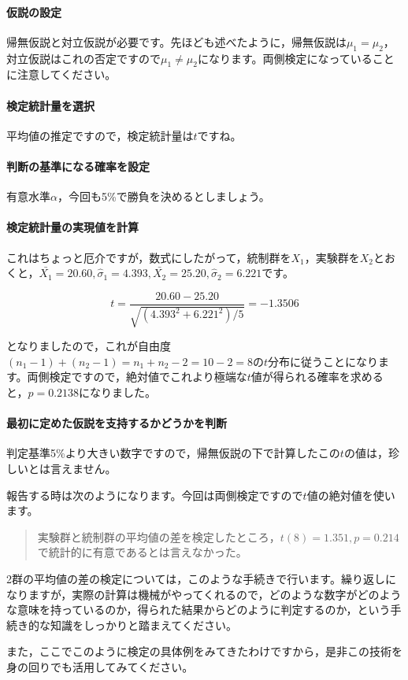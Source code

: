 \documentclass{ltjsbook}
\begin{document}
\paragraph{仮説の設定}帰無仮説と対立仮説が必要です。先ほども述べたように，帰無仮説は$\mu_1=\mu_2$，対立仮説はこれの否定ですので$\mu_1 \neq \mu_2$になります。両側検定になっていることに注意してください。
\paragraph{検定統計量を選択}平均値の推定ですので，検定統計量は$t$ですね。
\paragraph{判断の基準になる確率を設定}有意水準$\alpha$，今回も5\%で勝負を決めるとしましょう。
\paragraph{検定統計量の実現値を計算}これはちょっと厄介ですが，数式にしたがって，統制群を$X_1$，実験群を$X_2$とおくと，$\bar{X_1}=20.60,\hat{\sigma}_1=4.393,\bar{X_2}=25.20,\hat{\sigma}_2=6.221$です。

\[ t = \frac{20.60-25.20}{\sqrt{(4.393^2+6.221^2)/5}} = -1.3506\]

となりましたので，これが自由度$(n_1-1)+(n_2-1)=n_1+n_2-2=10-2=8$の$t$分布に従うことになります。両側検定ですので，絶対値でこれより極端な$t$値が得られる確率を求めると，$p=0.2138$になりました。

\paragraph{最初に定めた仮説を支持するかどうかを判断}
判定基準5\%より大きい数字ですので，帰無仮説の下で計算したこの$t$の値は，珍しいとは言えません。

報告する時は次のようになります。今回は両側検定ですので$t$値の絶対値を使います。
\begin{quote}
	実験群と統制群の平均値の差を検定したところ，$t(8)=1.351,p=0.214$で統計的に有意であるとは言えなかった。
\end{quote}

2群の平均値の差の検定については，このような手続きで行います。繰り返しになりますが，実際の計算は機械がやってくれるので，どのような数字がどのような意味を持っているのか，得られた結果からどのように判定するのか，という手続き的な知識をしっかりと踏まえてください。

また，ここでこのように検定の具体例をみてきたわけですから，是非この技術を身の回りでも活用してみてください。
\end{document}
